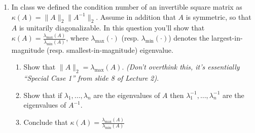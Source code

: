 \documentclass[10pt]{article}
\begin{document}
\begin{enumerate}
 \item In class we defined the condition number of an invertible square matrix as $\kappa(A) = \|A\|_2\|A^{-1}\|_2$. Assume in addition that $A$ is symmetric, so that $A$ is unitarily diagonalizable. In this question you'll show that $\kappa(A) = \frac{\lambda_{\max}(A)}{\lambda_{\min}(A)}$, where $\lambda_{\max}(\cdot)$ (resp. $\lambda_{\min}(\cdot)$) denotes the largest-in-magnitude (resp. smallest-in-magnitude) eigenvalue. 
\begin{enumerate}
	\item Show that $\|A\|_2 = \lambda_{\max}(A)$. {\em (Don't overthink this, it's essentially ``Special Case 1'' from slide 8 of Lecture 2)}. \\
	
	\item Show that if $\lambda_1,\ldots,\lambda_n$ are the eigenvalues of $A$ then $\lambda_1^{-1},\ldots, \lambda_{n}^{-1}$ are the eigenvalues of $A^{-1}$. \\
	
	\item Conclude that $\kappa(A) = \frac{\lambda_{\max}(A)}{\lambda_{\min}(A)}$

\end{enumerate}


\end{enumerate}
\end{document}

